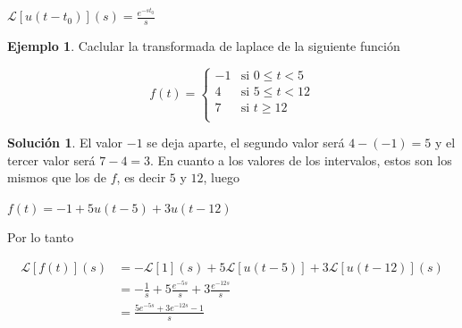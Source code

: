 \documentclass{article}
\theoremstyle{plain}
\theoremstyle{definition}
\newtheorem{ejem}[thm]{Ejemplo}
\newtheorem{sol}[thm]{Solución}
\begin{document}
\begin{center}
$\displaystyle \mathcal{L}[u(t-t_0)](s) = \frac{e^{-st_0}}{s}$
\end{center}


\begin{ejem}Caclular la transformada de laplace de la siguiente función
\end{ejem}




\begin{equation*}
f(t) =
\begin{cases}
-1 & \text{si $0 \leq t < 5$}\\
4 & \text{si $5 \leq t < 12$} \\
7 & \text{si $t \geq 12$} \\
\end{cases}
\end{equation*}

\begin{sol}El valor $-1$ se deja aparte, el segundo valor será $4-(-1)=5$ y el tercer valor será $7-4=3$. En cuanto a los valores de los intervalos, estos son los mismos que los de $f$, es decir $5$ y $12$, luego
\end{sol}

\begin{center}
$f(t) = -1+5u(t-5)+3u(t-12)$
\end{center}


Por lo tanto


\begin{align*}
\mathcal{L}[f(t)](s) &= -\mathcal{L}[1](s)+5\mathcal{L}[u(t-5)]+3\mathcal{L}[u(t-12)](s) \\
&= -\frac{1}{s}+5\frac{e^{-5s}}{s}+3\frac{e^{-12s}}{s} \\
&= \frac{5e^{-5s}+3e^{-12s}-1}{s}
\end{align*}

\newpage
\end{document}
